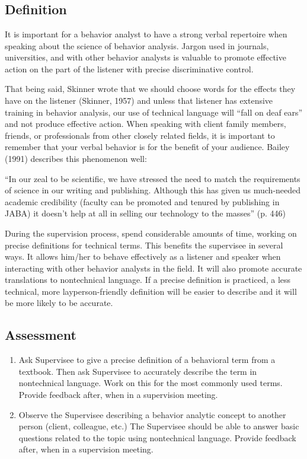 \clearpage \section[\fourgFour{}]{\fourgFour{}%
              }
\subsection{Definition}
It is important for a behavior analyst to have a strong verbal repertoire when speaking about the science of behavior analysis. Jargon used in journals, universities, and with other behavior analysts is valuable to promote effective action on the part of the listener with precise discriminative control. 

That being said, Skinner wrote that we should choose words for the effects they have on the listener (Skinner, 1957) and unless that listener has extensive training in behavior analysis, our use of technical language will ``fall on deaf ears'' and not produce effective action. When speaking with client family members, friends, or professionals from other closely related fields, it is important to remember that your verbal behavior is for the benefit of your audience. Bailey (1991) describes this phenomenon well:

``In our zeal to be scientific, we have stressed the need to match the requirements of science in our writing and publishing. Although this has given us much-needed academic credibility (faculty can be promoted and tenured by publishing in JABA) it doesn't help at all in selling our technology to the masses'' (p. 446)

During the supervision process, spend considerable amounts of time, working on precise definitions for technical terms. This benefits the supervisee in several ways. It allows him/her to behave effectively as a listener and speaker when interacting with other behavior analysts in the field. It will also promote accurate translations to nontechnical language. If a precise definition is practiced, a less technical, more layperson-friendly definition will be easier to describe and it will be more likely to be accurate.
%
\subsection{Assessment}
\begin{enumerate}
\item Ask Supervisee to give a precise definition of a behavioral term from a textbook. Then ask Supervisee to accurately describe the term in nontechnical language. Work on this for the most commonly used terms. Provide feedback after, when in a supervision meeting.
\item Observe the Supervisee describing a behavior analytic concept to another person (client, colleague, etc.) The Supervisee should be able to answer basic questions related to the topic using nontechnical language. Provide feedback after, when in a supervision meeting.
\end{enumerate}
%
